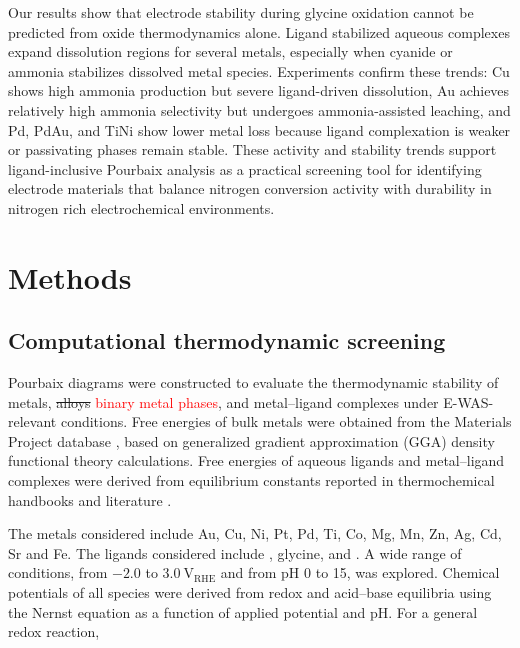\documentclass[twoside,twocolumn,9pt]{article}
\begin{document}
Our results show that electrode stability during glycine oxidation cannot be predicted from oxide thermodynamics alone. Ligand stabilized aqueous complexes expand dissolution regions for several metals, especially when cyanide or ammonia stabilizes dissolved metal species. Experiments confirm these trends: Cu shows high ammonia production but severe ligand-driven dissolution, Au achieves relatively high ammonia selectivity but undergoes ammonia-assisted leaching, and Pd, PdAu, and TiNi show lower metal loss because ligand complexation is weaker or passivating phases remain stable. These activity and stability trends support ligand-inclusive Pourbaix analysis as a practical screening tool for identifying electrode materials that balance nitrogen conversion activity with durability in nitrogen rich electrochemical environments.





\section{Methods}
\subsection{Computational thermodynamic screening}
Pourbaix diagrams were constructed to evaluate the thermodynamic stability of metals, \sout{alloys} \textcolor{red}{binary metal phases}, and metal–ligand complexes under E-WAS-relevant conditions. Free energies of bulk metals were obtained from the Materials Project database \cite{Jain2013TheInnovation}, based on generalized gradient approximation (GGA) density functional theory calculations. Free energies of aqueous ligands and metal–ligand complexes were derived from equilibrium constants reported in thermochemical handbooks \cite{Wagman1982TheUnits, Smith1989CriticalConstants, Bard2017StandardSolution, Bjerrum1957StabilitySubstances} and literature \cite{Meng1996PrinciplesReview, Azadi2019DataComplexes, Aviles2022ExploringNH3, Oraby2023SelectiveSolutions, Harrington2005DeterminationIon}.

The metals considered include Au, Cu, Ni, Pt, Pd, Ti, Co, Mg, Mn,  Zn, Ag, Cd, Sr and Fe. The ligands considered include , glycine, and . A wide range of conditions, from \(-2.0\) to \(3.0~\mathrm{V}_{\mathrm{RHE}}\) and from pH 0 to 15, was explored. Chemical potentials of all species were derived from redox and acid–base equilibria using the Nernst equation as a function of applied potential and pH. For a general redox reaction,
\end{document}

